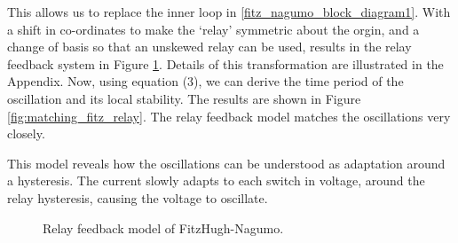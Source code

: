 \documentclass[a4paper, 12pt]{article}
\begin{document}
This allows us to replace the inner loop in \ref{fitz_nagumo_block_diagram1}. With a shift in co-ordinates to make the `relay' symmetric about the orgin, and a change of basis so that an unskewed relay can be used, results in the relay feedback system in Figure \ref{fig:fitz_nagumo_relay_block_diagram}. Details of this transformation are illustrated in the Appendix. Now, using equation (3), we can derive the time period of the oscillation and its local stability. The results are shown in Figure \ref{fig:matching_fitz_relay}. The relay feedback model matches the oscillations very closely. 

This model reveals how the oscillations can be understood as adaptation around a hysteresis. The current slowly adapts to each switch in voltage, around the relay hysteresis, causing the voltage to oscillate. 

\begin{figure}[h!]

\caption{Relay feedback model of FitzHugh-Nagumo.}
\label{fig:fitz_nagumo_relay_block_diagram}
\end{figure}
\end{document}

